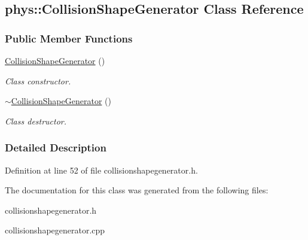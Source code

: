 \hypertarget{classphys_1_1CollisionShapeGenerator}{
\subsection{phys::CollisionShapeGenerator Class Reference}
\label{classphys_1_1CollisionShapeGenerator}
}
\subsubsection*{Public Member Functions}
\begin{DoxyCompactItemize}
\item 
\hypertarget{classphys_1_1CollisionShapeGenerator_a0d7537a7fcc47042edaccc3c30b02509}{
\hyperlink{classphys_1_1CollisionShapeGenerator_a0d7537a7fcc47042edaccc3c30b02509}{CollisionShapeGenerator} ()}
\label{classphys_1_1CollisionShapeGenerator_a0d7537a7fcc47042edaccc3c30b02509}

\begin{DoxyCompactList}\small\item\em Class constructor. \item\end{DoxyCompactList}\item 
\hypertarget{classphys_1_1CollisionShapeGenerator_a8c9289e5b8dda2e54d59feeece0645e3}{
\hyperlink{classphys_1_1CollisionShapeGenerator_a8c9289e5b8dda2e54d59feeece0645e3}{$\sim$CollisionShapeGenerator} ()}
\label{classphys_1_1CollisionShapeGenerator_a8c9289e5b8dda2e54d59feeece0645e3}

\begin{DoxyCompactList}\small\item\em Class destructor. \item\end{DoxyCompactList}\end{DoxyCompactItemize}


\subsubsection{Detailed Description}


Definition at line 52 of file collisionshapegenerator.h.



The documentation for this class was generated from the following files:\begin{DoxyCompactItemize}
\item 
collisionshapegenerator.h\item 
collisionshapegenerator.cpp\end{DoxyCompactItemize}
